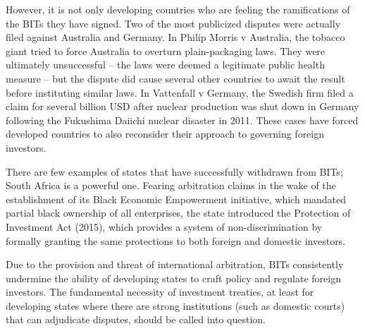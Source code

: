    However, it is not only developing countries who are feeling the
   ramifications of the BITs they have signed. Two of the most publicized
   disputes were actually filed against Australia and Germany. In Philip
   Morris v Australia, the tobacco giant tried to force Australia to
   overturn plain-packaging laws. They were ultimately unsuccessful -- the
   laws were deemed a legitimate public health measure -- but the dispute
   did cause several other countries to await the result before
   instituting similar laws. In Vattenfall v Germany, the Swedish firm
   filed a claim for several billion USD after nuclear production was shut
   down in Germany following the Fukushima Daiichi nuclear disaster in
   2011. These cases have forced developed countries to also reconsider
   their approach to governing foreign investors.

   There are few examples of states that have successfully withdrawn from
   BITs; South Africa is a powerful one. Fearing arbitration claims in the
   wake of the establishment of its Black Economic Empowerment initiative,
   which mandated partial black ownership of all enterprises, the state
   introduced the Protection of Investment Act (2015), which provides a
   system of non-discrimination by formally granting the same protections
   to both foreign and domestic investors.

   Due to the provision and threat of international arbitration, BITs
   consistently undermine the ability of developing states to craft policy
   and regulate foreign investors. The fundamental necessity of investment
   treaties, at least for developing states where there are strong
   institutions (such as domestic courts) that can adjudicate disputes,
   should be called into question.
